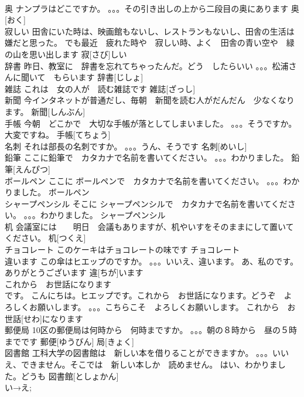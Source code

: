 \documentclass[8pt]{extreport}
\begin{document}
\begin{CJK}{UTF8}{min}
\\	奥	ナンプラはどこですか。 。。。その引き出しの上から二段目の奥にあります	奥[おく]					
\\	寂しい	田舎にいた時は、映画館もないし、レストランもないし、田舎の生活は嫌だと思った。 でも最近　疲れた時や　寂しい時、よく　田舎の青い空や　緑の山を思い出します	寂[さび]しい			
\\	辞書	昨日、教室に　辞書を忘れてちゃったんだ。どう　したらいい 。。。松浦さんに聞いて　もらいます	辞書[じしょ]			
\\	雑誌	これは　女の人が　読む雑誌です	雑誌[ざっし]			
\\	新聞	今インタネットが普通だし、毎朝　新聞を読む人がだんだん　少なくなります。	新聞[しんぶん]					
\\	手帳	今朝　どこかで　大切な手帳が落としてしまいました。 。。。そうですか。大変ですね。	手帳[てちょう]			
\\	名刺	それは部長の名刺ですか。 。。。うん、そうです	名刺[めいし]					
\\	鉛筆	ここに鉛筆で　カタカナで名前を書いてください。 。。。わかりました。	鉛筆[えんぴつ]			
\\	ボールペン	ここに ボールペンで　カタカナで名前を書いてください。 。。。わかりました。	ボールペン			
\\	シャープペンシル	そこに シャープペンシルで　カタカナで名前を書いてください。 。。。わかりました。	シャープペンシル			
\\	机	会議室には　　明日　会議もありますが、机やいすをそのままにして置いてください。	机[つくえ]			
\\	チョコレート	このケーキはチョコレートの味です	チョコレート			
\\	違います	この傘はヒエップのですか。 。。。いいえ、違います。 あ、私のです。ありがとうございます	違[ちが]います			
\\	これから　お世話になります	
\\	です。 こんにちは。ヒエップです。これから　お世話になります。どうぞ　よろしくお願いします。 。。。こちらこそ　よろしくお願いします。	これから　お 世話[せわ]になります					
\\	郵便局	10区の郵便局は何時から　何時まですか。 。。。朝の８時から　昼の５時までです	郵便[ゆうびん] 局[きょく]			
\\	図書館	工科大学の図書館は　新しい本を借りることができますか。 。。。いいえ、できません。そこでは　新しい本しか　読めません。 はい、わかりました。どうも	図書館[としょかん]			
\\	い→え;

\end{CJK}
\end{document}
